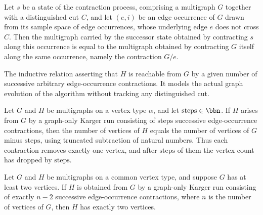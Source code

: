 \begin{lemma}
\label{KargerTrace.stateAfterSurvivingChoice_graph_eq}
\leanok
{}
Let $s$ be a state of the contraction process, comprising a multigraph $G$ together with
a distinguished cut $C$, and let $(e, i)$ be an edge occurrence of $G$ drawn from its
sample space of edge occurrences, whose underlying edge $e$ does not cross $C$. Then the
multigraph carried by the successor state obtained by contracting $s$ along this
occurrence is equal to the multigraph obtained by contracting $G$ itself along the same
occurrence, namely the contraction $G/e$.
\end{lemma}

\begin{definition}
\label{KargerTrace.KargerGraphRun}
\leanok
{}
The inductive relation asserting that $H$ is reachable from $G$ by a given number of
successive arbitrary edge-occurrence contractions.  It models the actual graph evolution
of the algorithm without tracking any distinguished cut.
\end{definition}

\begin{lemma}
\label{KargerTrace.kargerGraphRun_vertexCount_eq}
\leanok
{}
Let $G$ and $H$ be multigraphs on a vertex type $\alpha$, and let $\mathrm{steps} \in
\bbn$. If $H$ arises from $G$ by a graph-only Karger run consisting of $\mathrm{steps}$
successive edge-occurrence contractions, then the number of vertices of $H$ equals the
number of vertices of $G$ minus $\mathrm{steps}$, using truncated subtraction of natural
numbers. Thus each contraction removes exactly one vertex, and after $\mathrm{steps}$ of
them the vertex count has dropped by $\mathrm{steps}$.
\end{lemma}

\begin{lemma}
\label{KargerTrace.kargerGraphRun_full_vertexCount_eq_two}
\leanok
{}
Let $G$ and $H$ be multigraphs on a common vertex type, and suppose $G$ has at least two
vertices. If $H$ is obtained from $G$ by a graph-only Karger run consisting of exactly
$n - 2$ successive edge-occurrence contractions, where $n$ is the number of vertices of
$G$, then $H$ has exactly two vertices.
\end{lemma}

